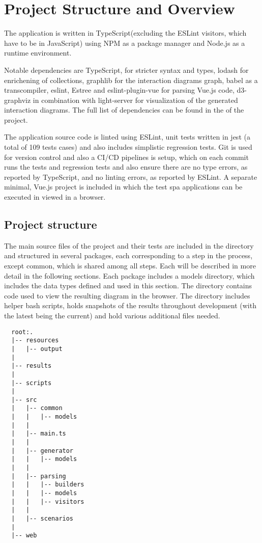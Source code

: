 \section{Project Structure and Overview}
The application is written in TypeScript(excluding the ESLint visitors, which have to be in JavaScript) using NPM as a package manager and Node.js as a runtime environment. 

Notable dependencies are TypeScript, for stricter syntax and types, lodash\parencite{lodash} for enrichening of collections, graphlib\parencite{graphlib} for the interaction diagrams graph,  babel\parencite{babel} as a transcompiler, eslint\parencite{eslintMainPage}, Estree\parencite{estreeASTSpec} and eslint-plugin-vue\parencite{eslint_vue_parser} for parsing Vue.js code, d3-graphviz\parencite{graph_viz} in combination with light-server\parencite{light_server} for visualization of the generated interaction diagrams. The full list of dependencies can be found in the  of the project.

The application source code is linted using ESLint, unit tests written in jest (a total of 109 tests cases) and also includes simplistic regression tests. Git is used for version control and also a CI/CD pipelines is setup, which on each commit runs the tests and regression tests and also ensure there are no type errors, as reported by TypeScript, and no linting errors, as reported by ESLint. 
A separate minimal, Vue.js project is included \parencite{KarakoA2021Feb} in which the test \gls{spa} applications can be executed in viewed in a browser.

\subsection{Project structure}
The main source files of the project and their tests are included in the  directory and structured in several packages, each corresponding to a step in the process, except common, which is shared among all steps. Each will be described in more detail in the following sections.
Each package includes a models directory, which includes the data types defined and used in this section.
The  directory contains code used to view the resulting diagram in the browser.
The  directory includes helper bash scripts,  holds snapshots of the results throughout development (with the latest being the current) and  hold various additional files needed.
\begin{lstlisting}
  root:.
  |-- resources
  |   |-- output
  |
  |-- results
  |
  |-- scripts
  |
  |-- src
  |   |-- common
  |   |   |-- models
  |   |
  |   |-- main.ts
  |   |
  |   |-- generator
  |   |   |-- models
  |   |
  |   |-- parsing
  |   |   |-- builders
  |   |   |-- models
  |   |   |-- visitors
  |   |
  |   |-- scenarios
  |
  |-- web
\end{lstlisting}

